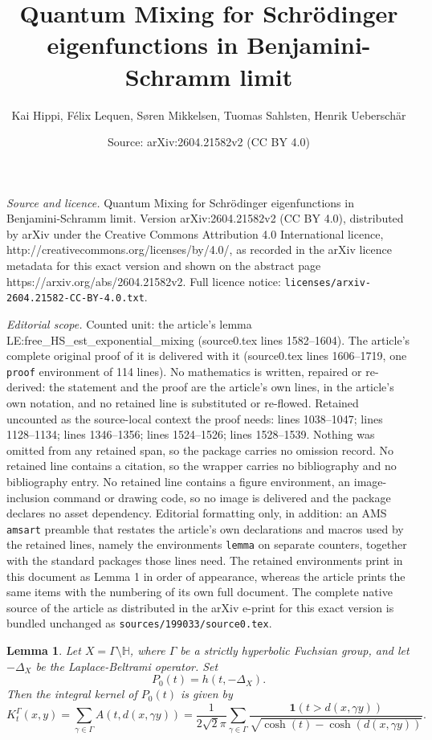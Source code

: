 \documentclass[10pt,a4paper]{amsart}
\title{Quantum Mixing for Schr\"odinger eigenfunctions in Benjamini-Schramm limit}
\author{Kai Hippi, F\'{e}lix Lequen, S{\o}ren Mikkelsen, Tuomas Sahlsten, Henrik Uebersch\"{a}r}
\date{Source: arXiv:2604.21582v2 (CC BY 4.0)}
\newtheorem{lemma}{Lemma}
\newcommand{\bH}{\mathbb{H}}
\begin{document}
\maketitle

\noindent\emph{Source and licence.} Quantum Mixing for Schr\"odinger eigenfunctions in Benjamini-Schramm limit. Version arXiv:2604.21582v2 (CC BY 4.0), distributed by arXiv under the Creative Commons Attribution 4.0 International licence, http://creativecommons.org/licenses/by/4.0/, as recorded in the arXiv licence metadata for this exact version and shown on the abstract page https://arxiv.org/abs/2604.21582v2. Full licence notice: \texttt{licenses/arxiv-2604.21582-CC-BY-4.0.txt}.\par\smallskip

\noindent\textit{Editorial scope.} Counted unit: the article's lemma LE:free\_HS\_est\_exponential\_mixing (source0.tex lines 1582--1604). The article's complete original proof of it is delivered with it (source0.tex lines 1606--1719, one \texttt{proof} environment of 114 lines). No mathematics is written, repaired or re-derived: the statement and the proof are the article's own lines, in the article's own notation, and no retained line is substituted or re-flowed.  Retained uncounted as the source-local context the proof needs: lines 1038--1047; lines 1128--1134; lines 1346--1356; lines 1524--1526; lines 1528--1539.  Nothing was omitted from any retained span, so the package carries no omission record.  No retained line contains a citation, so the wrapper carries no bibliography and no bibliography entry.  No retained line contains a figure environment, an image-inclusion command or drawing code, so no image is delivered and the package declares no asset dependency.  Editorial formatting only, in addition: an AMS \texttt{amsart} preamble that restates the article's own declarations and macros used by the retained lines, namely the environments \texttt{lemma} on separate counters, together with the standard packages those lines need.  The retained environments print in this document as Lemma 1 in order of appearance, whereas the article prints the same items with the numbering of its own full document.  The complete native source of the article as distributed in the arXiv e-print for this exact version is bundled unchanged as \texttt{sources/199033/source0.tex}.
\begin{lemma}\label{LE:kernel_of_unper_pro}
    Let $X=\Gamma\setminus \bH$, where $\Gamma$ be a strictly hyperbolic Fuchsian group, and let $-\Delta_X$ be the Laplace-Beltrami operator. Set
    \begin{equation*}
        P_0(t) = h(t,-\Delta_X).
    \end{equation*}
    Then the integral kernel of $P_0(t)$ is given by
    \begin{equation*}
        K^\Gamma_{t}(x,y)= \sum_{\gamma \in \Gamma} A(t,d(x,\gamma y)) =\frac{1}{2\sqrt{2} \pi} \sum_{\gamma \in \Gamma} \frac{\boldsymbol{1}(t> d(x,\gamma y))}{\sqrt{\cosh(t) - \cosh(d(x,\gamma y))}}.
    \end{equation*}
\end{lemma}
\end{document}
